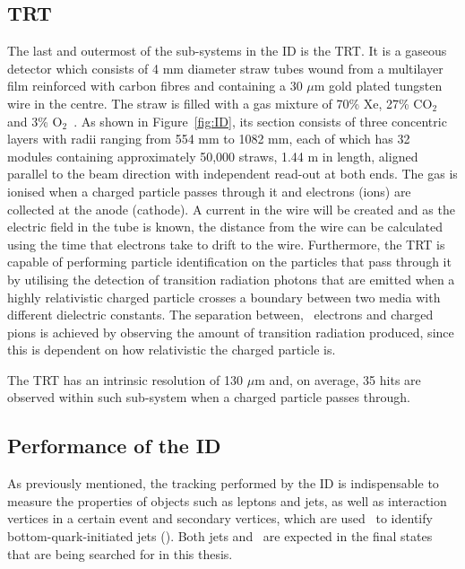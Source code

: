 			\subsection*{TRT}
			 
				The last and outermost of the sub-systems in the \ac{ID} is the \ac{TRT}. It is a gaseous detector which consists of 4 mm diameter straw tubes wound from a multilayer film reinforced with carbon fibres and containing a 30 $\mu$m gold plated tungsten wire in the centre. The straw is filled with a gas mixture of 70\% Xe, 27\% CO$_2$ and 3\% O$_2$~\cite{TRT2012}. As shown in Figure~\ref{fig:ID}, its section consists of three concentric layers with radii ranging from 554 mm to 1082 mm, each of which has 32 modules containing approximately 50,000 straws, 1.44 m in length, aligned parallel to the beam direction with independent read-out at both ends. The gas is ionised when a charged particle passes through it and electrons (ions) are collected at the anode (cathode). A current in the wire will be created and as the electric field in the tube is known, the distance from the wire can be calculated using the time that electrons take to drift to the wire. 
				Furthermore, the \ac{TRT} is capable of performing particle identification on the particles that pass through it by utilising the detection of transition radiation photons that are emitted when a highly relativistic charged particle crosses a boundary between two media with different dielectric constants. The separation between, \eg\ electrons and charged pions is achieved by observing the amount of transition radiation produced, since this is dependent on how relativistic the charged particle is.

				The \ac{TRT} has an intrinsic resolution of 130 $\mu$m and, on average, 35 hits are observed within such sub-system when a charged particle passes through.


			\subsection*{Performance of the ID}

				As previously mentioned, the tracking performed by the \ac{ID} is indispensable to measure the properties of objects such as leptons and jets, as well as interaction vertices in a certain event and secondary vertices, which are used \eg\ to identify bottom-quark-initiated jets (\bjs). Both jets and \bjs\ are expected in the final states that are being searched for in this thesis. 

